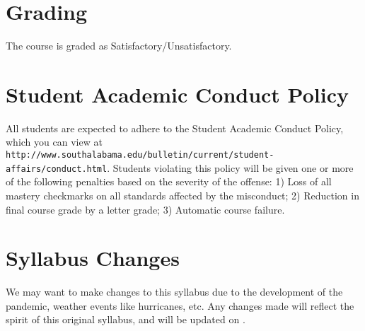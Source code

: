 \documentclass{article}
\begin{document}
\section*{\fontsize{12}{15}\selectfont Grading}
The course is graded as Satisfactory/Unsatisfactory.



\section*{\fontsize{12}{15}\selectfont Student Academic Conduct Policy}
All students are expected to adhere to the Student Academic Conduct Policy, which you can view at
{\tt http://www.southalabama.edu/bulletin/current/student-affairs/conduct.html}.  Students violating this policy will be given one or more of the following penalties based on the severity of the offense:  1) Loss of all mastery checkmarks on all standards affected by the misconduct; 2) Reduction in final course grade by a letter grade; 3) Automatic course failure.


\section*{\fontsize{12}{15}\selectfont Syllabus Changes}
We may want to make changes to this syllabus due to the development of the pandemic, weather events like hurricanes, etc. Any changes made will reflect the spirit of this original syllabus, and will be updated on \LMS.
\end{document}
